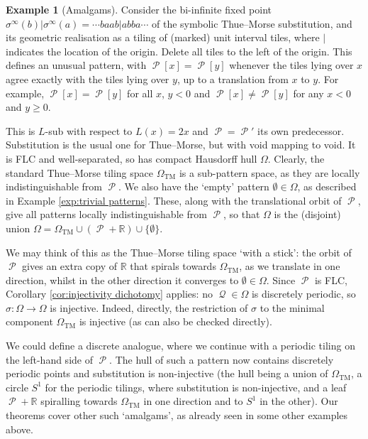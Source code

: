 \documentclass[11pt]{amsart}
\numberwithin{equation}{section}
\theoremstyle{plain}
\theoremstyle{definition}
\newtheorem{example}[theorem]{Example}
\newcommand{\R}{\mathbb R}
\newcommand{\sub}{\sigma}
\DeclareMathOperator{\cP}{\mathcal{P}}
\DeclareMathOperator{\cQ}{\mathcal{Q}}
\begin{document}
\begin{example}[Amalgams]
Consider the bi-infinite fixed point \(\sub^\infty(b) | \sub^\infty(a) = \cdots baab | abba \cdots\) of the symbolic Thue--Morse substitution, and its geometric realisation as a tiling of (marked) unit interval tiles, where \(|\) indicates the location of the origin. Delete all tiles to the left of the origin. This defines an unusual pattern, with \(\cP[x] = \cP[y]\) whenever the tiles lying over \(x\) agree exactly with the tiles lying over \(y\), up to a translation from \(x\) to \(y\). For example, \(\cP[x] = \cP[y]\) for all \(x\), \(y < 0\) and \(\cP[x] \neq \cP[y]\) for any \(x < 0\) and \(y \geq 0\).

This is \(L\)-sub with respect to \(L(x) = 2x\) and \(\cP = \cP'\) its own predecessor. Substitution is the usual one for Thue--Morse, but with void mapping to void. It is FLC and well-separated, so has compact Hausdorff hull \(\Omega\). Clearly, the standard Thue--Morse tiling space \(\Omega_\mathrm{TM}\) is a sub-pattern space, as they are locally indistinguishable from \(\cP\). We also have the `empty' pattern \(\emptyset \in \Omega\), as described in Example \ref{exp:trivial patterns}. These, along with the translational orbit of \(\cP\), give all patterns locally indistinguishable from \(\cP\), so that \(\Omega\) is the (disjoint) union \(\Omega = \Omega_\mathrm{TM} \cup (\cP + \R) \cup \{\emptyset\}\).

We may think of this as the Thue--Morse tiling space `with a stick': the orbit of \(\cP\) gives an extra copy of \(\R\) that spirals towards \(\Omega_\mathrm{TM}\), as we translate in one direction, whilst in the other direction it converges to \(\emptyset \in \Omega\). Since \(\cP\) is FLC, Corollary \ref{cor:injectivity dichotomy} applies: no \(\cQ \in \Omega\) is discretely periodic, so \(\sub \colon \Omega \to \Omega\) is injective. Indeed, directly, the restriction of \(\sub\) to the minimal component \(\Omega_\mathrm{TM}\) is injective (as can also be checked directly).

We could define a discrete analogue, where we continue with a periodic tiling on the left-hand side of \(\cP\). The hull of such a pattern now contains discretely periodic points and substitution is non-injective (the hull being a union of \(\Omega_\mathrm{TM}\), a circle \(S^1\) for the periodic tilings, where substitution is non-injective, and a leaf \(\cP+\R\) spiralling towards \(\Omega_\mathrm{TM}\) in one direction and to \(S^1\) in the other). Our theorems cover other such `amalgams', as already seen in some other examples above.
\end{example}
\end{document}
